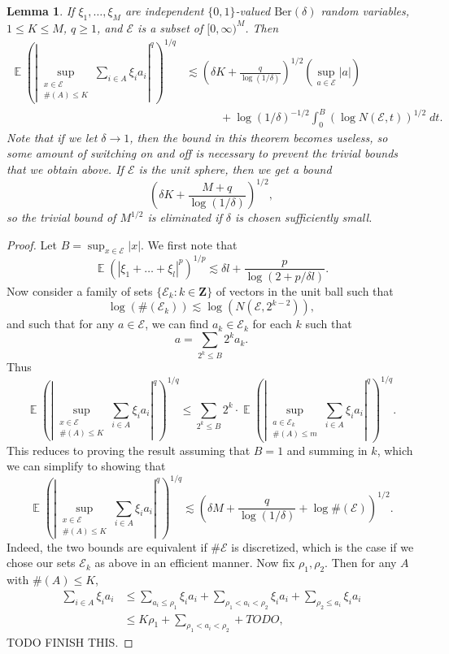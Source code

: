 \documentclass[dvipsnames,letterpaper,12pt]{article}
\numberwithin{equation}{section}
\newtheorem{lemma}[theorem]{Lemma}
\numberwithin{theorem}{section}
\DeclareMathOperator{\EE}{\mathbb{E}}
\begin{document}
\begin{lemma}
    If $\xi_1,\dots,\xi_M$ are independent $\{ 0, 1 \}$-valued $\text{Ber}(\delta)$ random variables, $1 \leq K \leq M$, $q \geq 1$, and $\mathcal{E}$ is a subset of $[0,\infty)^M$. Then
    \begin{align*}
        \EE \left( \left| \sup_{\substack{x \in \mathcal{E}\\ \#(A) \leq K}} \sum_{i \in A} \xi_i a_i \right|^q \right)^{1/q} &\lesssim \left( \delta K + \frac{q}{\log(1/\delta)} \right)^{1/2} \left( \sup_{a \in \mathcal{E}} |a| \right)\\
        &\quad\quad\quad + \log(1/\delta)^{-1/2} \int_0^B (\log N(\mathcal{E},t))^{1/2}\; dt.
    \end{align*}
    Note that if we let $\delta \to 1$, then the bound in this theorem becomes useless, so some amount of switching on and off is necessary to prevent the trivial bounds that we obtain above. If $\mathcal{E}$ is the unit sphere, then we get a bound
    \[ \left( \delta K + \frac{M + q}{\log(1/\delta)} \right)^{1/2}, \]
    so the trivial bound of $M^{1/2}$ is eliminated if $\delta$ is chosen sufficiently small.
\end{lemma}
\begin{proof}
    Let $B = \sup_{x \in \mathcal{E}} |x|$. We first note that
    \[ \EE \left( |\xi_1 + \dots + \xi_l|^p \right)^{1/p} \lesssim \delta l + \frac{p}{\log(2 + p/\delta l)}. \]
    Now consider a family of sets $\{ \mathcal{E}_k : k \in \mathbf{Z} \}$ of vectors in the unit ball such that
    \[ \log ( \#(\mathcal{E}_k) ) \lesssim \log ( N(\mathcal{E}, 2^{k-2}) ), \]
    and such that for any $a \in \mathcal{E}$, we can find $a_k \in \mathcal{E}_k$ for each $k$ such that
    \[ a = \sum_{2^k \leq B} 2^k a_k. \]
    Thus
    \[ \EE \left( \left| \sup_{\substack{x \in \mathcal{E}\\ \#(A) \leq K}} \sum_{i \in A} \xi_i a_i \right|^q \right)^{1/q} \leq \sum_{2^k \leq B} 2^k \cdot \EE \left( \left| \sup_{\substack{a \in \mathcal{E}_k\\\#(A) \leq m}} \sum_{i \in A} \xi_i a_i \right|^q \right)^{1/q}. \]
    This reduces to proving the result assuming that $B = 1$ and summing in $k$, which we can simplify to showing that 
    \[ \EE \left( \left| \sup_{\substack{x \in \mathcal{E}\\ \#(A) \leq K}} \sum_{i \in A} \xi_i a_i \right|^q \right)^{1/q} \lesssim \left( \delta M + \frac{q}{\log(1/\delta)} + \log \#(\mathcal{E}) \right)^{1/2}. \]
    Indeed, the two bounds are equivalent if $\# \mathcal{E}$ is discretized, which is the case if we chose our sets $\mathcal{E}_k$ as above in an efficient manner. Now fix $\rho_1, \rho_2$. Then for any $A$ with $\#(A) \leq K$,
    \begin{align*}
        \sum_{i \in A} \xi_i a_i &\leq \sum_{a_i \leq \rho_1} \xi_i a_i + \sum_{\rho_1 < a_i < \rho_2} \xi_i a_i + \sum_{\rho_2 \leq a_i} \xi_i a_i\\
        &\leq K \rho_1 + \sum_{\rho_1 < a_i < \rho_2} + TODO,
    \end{align*}
    TODO FINISH THIS.
\end{proof}
\end{document}
